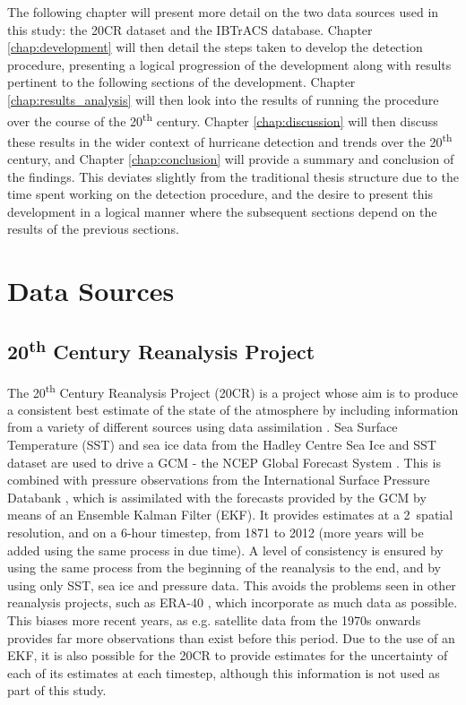 \documentclass[pdftex,12pt,a4paper]{report}
\newcommand{\ts}{\textsuperscript}
\begin{document}
The following chapter will present more detail on the two data sources used in this study: the
20CR dataset and the IBTrACS database. Chapter \ref{chap:development} will then detail the steps
taken to develop the detection procedure, presenting a logical progression of the development along
with results pertinent to the following sections of the development. Chapter
\ref{chap:results_analysis} will then look into the results of running the procedure over the course
of the 20\ts{th} century. Chapter \ref{chap:discussion} will then discuss these results in the wider
context of hurricane detection and trends over the 20\ts{th} century, and Chapter
\ref{chap:conclusion} will provide a summary and conclusion of the findings. This deviates slightly
from the traditional thesis structure due to the time spent working on the detection procedure, and
the desire to present this development in a logical manner where the subsequent sections depend on
the results of the previous sections.

\chapter{Data Sources}

\section{20\ts{th} Century Reanalysis Project}
\label{sec:20crp}

The 20\ts{th} Century Reanalysis Project (20CR) is a project whose aim is to produce a consistent
best estimate of the state of the atmosphere by including information from a variety of different
sources using data assimilation \parencite{compoTwentieth2011}. Sea Surface Temperature (SST) and
sea ice data from the Hadley Centre Sea Ice and SST dataset \parencite{rayner2003global} are used to drive
a GCM - the NCEP Global Forecast System \parencite{kanamitsu1989description, kanamitsu1991recent}.
This is combined with pressure observations from the International Surface Pressure Databank
\parencite{yin2008international}, which is assimilated with the forecasts provided by the GCM by means of an
Ensemble Kalman Filter (EKF). It provides estimates at a 2\textdegree\ spatial resolution, and on a
6-hour timestep, from 1871 to 2012 (more years will be added using the same process in due time). A
level of consistency is ensured by using the same process from the beginning of the reanalysis to
the end, and by using only SST, sea ice and pressure data. This avoids the problems seen in other
reanalysis projects, such as ERA-40 \parencite{uppala2005era}, which incorporate as much data as
possible. This biases more recent years, as e.g. satellite data from the 1970s onwards provides far
more observations than exist before this period. Due to the use of an EKF, it is also possible for
the 20CR to provide estimates for the uncertainty of each of its estimates at each timestep,
although this information is not used as part of this study.
\end{document}
